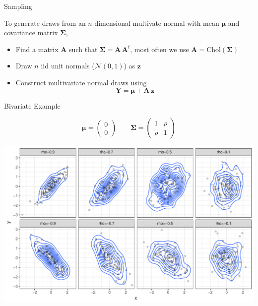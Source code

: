 \documentclass[11pt,ignorenonframetext,]{beamer}
\providecommand{\tightlist}{%
  \setlength{\itemsep}{0pt}\setlength{\parskip}{0pt}}
\begin{document}
\begin{frame}[t]{Sampling}

To generate draws from an \(n\)-dimensional multivate normal with mean
\(\bm\mu\) and covariance matrix \(\bm\Sigma\),

\vspace{4mm}

\pause

\begin{itemize}
\tightlist
\item
  Find a matrix \(\bm{A}\) such that \(\bm\Sigma = \bm{A}\,\bm{A}^t\),
  most often we use \(\bm{A} = \text{Chol}(\bm\Sigma)\)
\end{itemize}

\pause

\vspace{2mm}

\begin{itemize}
\tightlist
\item
  Draw \(n\) iid unit normals (\(\mathcal{N}(0,1)\)) as \(\bm{z}\)
\end{itemize}

\pause

\vspace{2mm}

\begin{itemize}
\tightlist
\item
  Construct multivariate normal draws using
  \[ \bm{Y} = \bm\mu + \bm{A} \, \bm{z} \]
\end{itemize}

\end{frame}

\begin{frame}{Bivariate Example}

\scriptsize
\[ \bm{\mu} = \begin{pmatrix}0 \\ 0\end{pmatrix} \qquad \bm{\Sigma} = \begin{pmatrix}1 & \rho \\ \rho & 1 \end{pmatrix}\]

\includegraphics{Lec12_files/figure-beamer/unnamed-chunk-1-1.pdf}

\end{frame}
\end{document}
